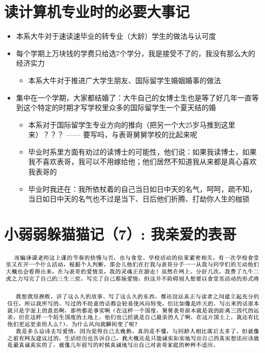 \documentclass[9pt, b5paper]{article}
\begin{document}
\section{读计算机专业时的必要大事记}
\label{sec:org4d69804}
\begin{itemize}
\item 本系大牛对于速读速毕业的转专业（大龄）学生的做法与认可度
\item 每个学期上万块钱的学费只给选7个学分，我是接受不了的，我没有那么大的经济实力
\begin{itemize}
\item 本系大牛对于推进广大学生朋友、国际留学生婚姻婚事的做法
\end{itemize}
\item 集中在一个学期，大家都结婚了：大牛自己的女博士生也是等了好几年一直等到这个特定的时期才写学校里众多的国际留学生一个夏天结的婚
\begin{itemize}
\item 本系对于国际留学生专业方向的推向（把另一个大25岁马推到这里来）？？？ —— 要写吗，与表哥舅舅学校的比起来呢
\item 毕业时系里方面有劝过的读博士的可能性，他们说：如果我读博士，如果我不喜欢表哥，我可以不用嫁给他；他们居然不知道我从来都是真心喜欢我表哥的
\item 毕业时我还在：我所依杖着的自己当日如日中天的名气，呵呵，疏不知，当日如日中天的名气也不过是当下、日后他们折腾、打劫你人生的枷锁
\end{itemize}
\end{itemize}


\section{小弱弱躲猫猫记（7）: 我亲爱的表哥}
\label{sec:org85dc378}

\begin{center}
\includegraphics[width=.9\linewidth]{./pic/backups_plans_20210422_075218.png}
\end{center}

\begin{center}
\includegraphics[width=.9\linewidth]{./pic/backups_plans_20210422_075500.png}
\end{center}
\end{document}
